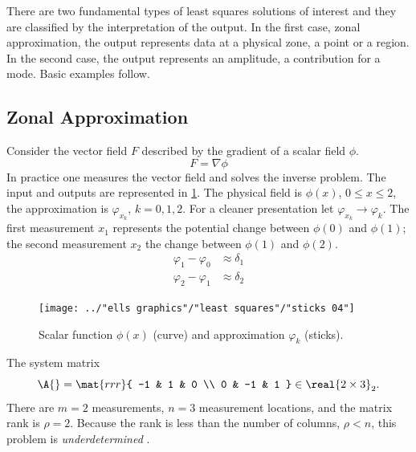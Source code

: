 There are two fundamental types of least squares solutions of interest and they are classified by the interpretation of the output. In the first case, zonal approximation, the output represents data at a physical zone, a point or a region. In the second case, the output represents an amplitude, a contribution for a mode. Basic examples follow.

\subsection{\label{ssec:zonal approx}Zonal Approximation}  %
Consider the vector field $F$ described by the gradient of a scalar field $\phi$.
  \begin{equation*}   %
    F = \nabla \phi
  \end{equation*}
In practice one measures the vector field and solves the inverse problem. The input and outputs are represented in \ref{fig:sticks}. The physical field is $\phi(x)$, $0\le x \le 2$, the approximation is $\varphi_{x_{k}}$, $k=0,1,2$. For a cleaner presentation let $\varphi_{x_{k}} \rightarrow \varphi_{k}$. The first measurement $x_{1}$ represents the potential change between $\phi(0)$ and $\phi(1)$; the second measurement $x_{2}$ the change between $\phi(1)$ and $\phi(2)$.
  \begin{equation*}   %
    \begin{split}
      \varphi_{1} - \varphi_{0} &\approx \delta_{1} \\
      \varphi_{2} - \varphi_{1} &\approx \delta_{2}
    \end{split}
  \end{equation*}
\begin{figure}[htbp] %
   \centering
   \texttt{[image: ../"ells graphics"/"least squares"/"sticks 04"]} 
   \caption[Scalar function $\phi$ and approximations.]{Scalar function $\phi(x)$ (curve) and approximation $\varphi_{k}$ (sticks).}
   \label{fig:sticks}
\end{figure}

The system matrix 
  \begin{equation*}   %
      \A{} =     \mat{rrr}{ 
      -1 & 1 & 0 \\
       0 & -1 & 1 } \in \real{2 \times 3}_{2}.
  \end{equation*}
There are $m = 2$ measurements, $n = 3$ measurement locations, and the matrix rank is $\rho = 2$. Because the rank is less than the number of columns, $\rho < n$, this problem is \emph{underdetermined} .

